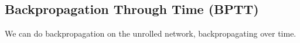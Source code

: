 
\subsection{Backpropagation Through Time (BPTT)}

We can do backpropagation on the unrolled network, backpropagating over time.

